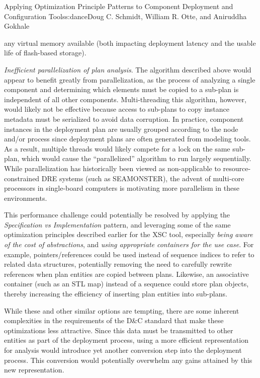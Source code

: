 \begin{aosachapter}{Applying Optimization Principle Patterns to Component Deployment and
                    Configuration Tools}{s:dance}{Doug C. Schmidt, William R. Otte, and Aniruddha Gokhale}
\begin{aosaenumerate}
  any virtual memory available (both impacting deployment latency and
  the usable life of flash-based storage).
\item
  \emph{Inefficient parallelization of plan analysis}. The algorithm
  described above would appear to benefit greatly from parallelization,
  as the process of analyzing a single component and determining which
  elements must be copied to a sub-plan is independent of all other
  components. Multi-threading this algorithm, however, would likely not
  be effective because access to sub-plans to copy instance metadata
  must be serialized to avoid data corruption. In practice, component
  instances in the deployment plan are usually grouped according to the
  node and/or process since deployment plans are often generated from
  modeling tools. As a result, multiple threads would likely compete for
  a lock on the same sub-plan, which would cause the ``parallelized''
  algorithm to run largely sequentially. While parallelization has
  historically been viewed as non-applicable to resource-constrained DRE
  systems (such as SEAMONSTER), the advent of multi-core processors in
  single-board computers is motivating more parallelism in these
  environments.
\end{aosaenumerate}


This performance challenge could potentially be resolved by applying the
\emph{Specification vs Implementation} pattern, and leveraging some of
the same optimization principles described earlier for the XSC tool,
especially \emph{being aware of the cost of abstractions}, and
\emph{using appropriate containers for the use case}. For example,
pointers/references could be used instead of sequence indices to refer
to related data structures, potentially removing the need to carefully
rewrite references when plan entities are copied between plans.
Likewise, an associative container (such as an STL map) instead of a
sequence could store plan objects, thereby increasing the efficiency of
inserting plan entities into sub-plans.

While these and other similar options are tempting, there are some
inherent complexities in the requirements of the D\&C standard that make
these optimizations less attractive. Since this data must be transmitted
to other entities as part of the deployment process, using a more
efficient representation for analysis would introduce yet another
conversion step into the deployment process. This conversion would
potentially overwhelm any gains attained by this new representation.


\end{aosachapter}
